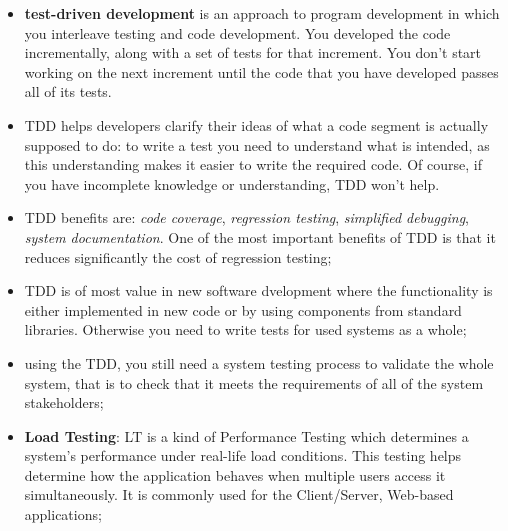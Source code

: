 \documentclass[oneside]{article}
\begin{document}
\begin{itemize}
    
    \item \textbf{test-driven development} is an approach to program development in which you interleave testing and code development. You developed the code incrementally, along with a set of tests for that increment. You don't start working on the next increment until the code that you have developed passes all of its tests.
    \begin{figure}[!htb]
    \end{figure}
    
    \item TDD helps developers clarify their ideas of what a code segment is actually supposed to do: to write a test you need to understand what is intended, as this understanding makes it easier to write the required code. Of course, if you have incomplete knowledge or understanding, TDD won't help.
    
    \item TDD benefits are: \textit{code coverage}, \textit{regression testing}, \textit{simplified debugging}, \textit{system documentation}. One of the most important benefits of TDD is that it reduces significantly the cost of regression testing;
    
    \item TDD is of most value in new software dvelopment where the functionality is either implemented in new code or by using components from standard libraries. Otherwise you need to write tests for used systems as a whole;
    
    \item using the TDD, you still need a system testing process to validate the whole system, that is to check that it meets the requirements of all of the system stakeholders;
    
    \item \textbf{Load Testing}: LT is a kind of Performance Testing which determines a system's performance under real-life load conditions. This testing helps determine how the application behaves when multiple users access it simultaneously. It is commonly used for the Client/Server, Web-based applications; 
\end{itemize}
\end{document}
